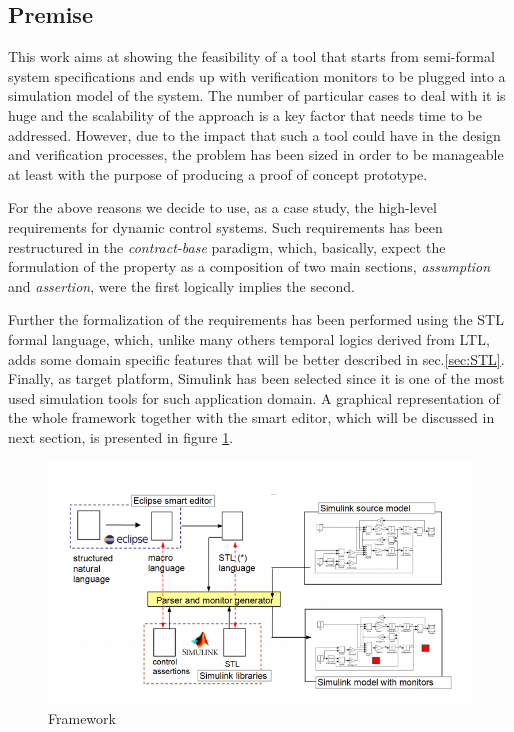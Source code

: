 \subsection{Premise}
This work aims at showing the feasibility of a tool that starts from semi-formal system specifications and ends up with verification monitors to be plugged into a simulation model of the system. The number of particular cases to deal with it is huge and the scalability of the approach is a key factor that needs time to be addressed. However, due to the impact that such a tool could have in the design and verification processes, the problem has been sized in order to be manageable at least with the purpose of producing a proof of concept prototype.
\par For the above reasons we decide to use, as a case study, the high-level requirements for dynamic control systems. Such requirements has been restructured in the \textit{contract-base} paradigm, which, basically, expect the formulation of the property as a composition of two main sections, \textit{assumption} and \textit{assertion}, were the first logically implies the second.
\par Further the formalization of the requirements has been performed using the STL formal language, which, unlike many others temporal logics derived from LTL, adds some domain specific features that will be better described in sec.\ref{sec:STL}. Finally, as target platform, Simulink has been selected since it is one of the most used simulation tools for such application domain. A graphical representation of the whole framework together with the smart editor, which will be discussed in next section, is presented in figure \ref{fig:framework}.

\begin{figure}[!h]
	\centering 
     \includegraphics[width=1\textwidth]{Figs/framework.png} 
     \caption{Framework} 
     \label{fig:framework} 
\end{figure}

